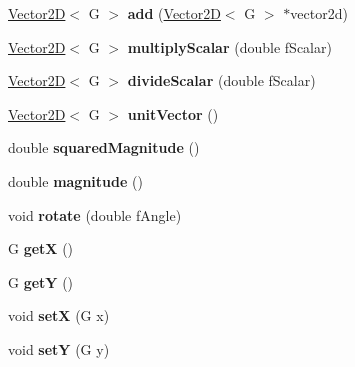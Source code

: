 \begin{DoxyCompactItemize}
\item 
\hypertarget{class_vector2_d_a2c65e6b82fc1879c564850a6f212a588}{}\hyperlink{class_vector2_d}{Vector2\+D}$<$ G $>$ {\bfseries add} (\hyperlink{class_vector2_d}{Vector2\+D}$<$ G $>$ $\ast$vector2d)\label{class_vector2_d_a2c65e6b82fc1879c564850a6f212a588}

\item 
\hypertarget{class_vector2_d_a0dcbc4d12ccef65bf193a52d92fe13b7}{}\hyperlink{class_vector2_d}{Vector2\+D}$<$ G $>$ {\bfseries multiply\+Scalar} (double f\+Scalar)\label{class_vector2_d_a0dcbc4d12ccef65bf193a52d92fe13b7}

\item 
\hypertarget{class_vector2_d_ab87df45d2980f3702f349d2ac7970801}{}\hyperlink{class_vector2_d}{Vector2\+D}$<$ G $>$ {\bfseries divide\+Scalar} (double f\+Scalar)\label{class_vector2_d_ab87df45d2980f3702f349d2ac7970801}

\item 
\hypertarget{class_vector2_d_a1a734dd9f1ca01a88bac3f6bf2be97d0}{}\hyperlink{class_vector2_d}{Vector2\+D}$<$ G $>$ {\bfseries unit\+Vector} ()\label{class_vector2_d_a1a734dd9f1ca01a88bac3f6bf2be97d0}

\item 
\hypertarget{class_vector2_d_af4162d18ba5939bd0175ae01ad6f0221}{}double {\bfseries squared\+Magnitude} ()\label{class_vector2_d_af4162d18ba5939bd0175ae01ad6f0221}

\item 
\hypertarget{class_vector2_d_aab76e76bb642784480bdd231b90b1273}{}double {\bfseries magnitude} ()\label{class_vector2_d_aab76e76bb642784480bdd231b90b1273}

\item 
\hypertarget{class_vector2_d_a85f594928169b9c4bb74cc26ab43d111}{}void {\bfseries rotate} (double f\+Angle)\label{class_vector2_d_a85f594928169b9c4bb74cc26ab43d111}

\item 
\hypertarget{class_vector2_d_a46521876fbb0b52881eba97a074ba59c}{}G {\bfseries get\+X} ()\label{class_vector2_d_a46521876fbb0b52881eba97a074ba59c}

\item 
\hypertarget{class_vector2_d_ac0ecf6cdb4b8106b8c1c2a08efc728df}{}G {\bfseries get\+Y} ()\label{class_vector2_d_ac0ecf6cdb4b8106b8c1c2a08efc728df}

\item 
\hypertarget{class_vector2_d_a6c5526343de1af297d3cc4baca03a9b1}{}void {\bfseries set\+X} (G x)\label{class_vector2_d_a6c5526343de1af297d3cc4baca03a9b1}

\item 
\hypertarget{class_vector2_d_ac7ba076a26efb04c2e590a0cdd3fd20e}{}void {\bfseries set\+Y} (G y)\label{class_vector2_d_ac7ba076a26efb04c2e590a0cdd3fd20e}

\end{DoxyCompactItemize}



